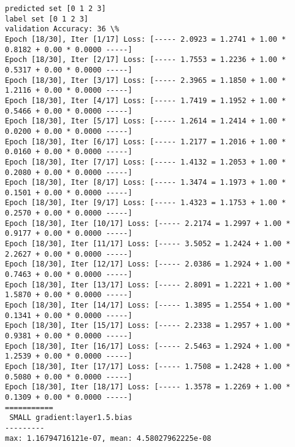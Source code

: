 \documentclass[11pt]{article}
\begin{document}
    \begin{Verbatim}[commandchars=\\\{\}]
predicted set [0 1 2 3]
label set [0 1 2 3]
validation Accuracy: 36 \%
Epoch [18/30], Iter [1/17] Loss: [----- 2.0923 = 1.2741 + 1.00 * 0.8182 + 0.00 * 0.0000 -----]
Epoch [18/30], Iter [2/17] Loss: [----- 1.7553 = 1.2236 + 1.00 * 0.5317 + 0.00 * 0.0000 -----]
Epoch [18/30], Iter [3/17] Loss: [----- 2.3965 = 1.1850 + 1.00 * 1.2116 + 0.00 * 0.0000 -----]
Epoch [18/30], Iter [4/17] Loss: [----- 1.7419 = 1.1952 + 1.00 * 0.5466 + 0.00 * 0.0000 -----]
Epoch [18/30], Iter [5/17] Loss: [----- 1.2614 = 1.2414 + 1.00 * 0.0200 + 0.00 * 0.0000 -----]
Epoch [18/30], Iter [6/17] Loss: [----- 1.2177 = 1.2016 + 1.00 * 0.0160 + 0.00 * 0.0000 -----]
Epoch [18/30], Iter [7/17] Loss: [----- 1.4132 = 1.2053 + 1.00 * 0.2080 + 0.00 * 0.0000 -----]
Epoch [18/30], Iter [8/17] Loss: [----- 1.3474 = 1.1973 + 1.00 * 0.1501 + 0.00 * 0.0000 -----]
Epoch [18/30], Iter [9/17] Loss: [----- 1.4323 = 1.1753 + 1.00 * 0.2570 + 0.00 * 0.0000 -----]
Epoch [18/30], Iter [10/17] Loss: [----- 2.2174 = 1.2997 + 1.00 * 0.9177 + 0.00 * 0.0000 -----]
Epoch [18/30], Iter [11/17] Loss: [----- 3.5052 = 1.2424 + 1.00 * 2.2627 + 0.00 * 0.0000 -----]
Epoch [18/30], Iter [12/17] Loss: [----- 2.0386 = 1.2924 + 1.00 * 0.7463 + 0.00 * 0.0000 -----]
Epoch [18/30], Iter [13/17] Loss: [----- 2.8091 = 1.2221 + 1.00 * 1.5870 + 0.00 * 0.0000 -----]
Epoch [18/30], Iter [14/17] Loss: [----- 1.3895 = 1.2554 + 1.00 * 0.1341 + 0.00 * 0.0000 -----]
Epoch [18/30], Iter [15/17] Loss: [----- 2.2338 = 1.2957 + 1.00 * 0.9381 + 0.00 * 0.0000 -----]
Epoch [18/30], Iter [16/17] Loss: [----- 2.5463 = 1.2924 + 1.00 * 1.2539 + 0.00 * 0.0000 -----]
Epoch [18/30], Iter [17/17] Loss: [----- 1.7508 = 1.2428 + 1.00 * 0.5080 + 0.00 * 0.0000 -----]
Epoch [18/30], Iter [18/17] Loss: [----- 1.3578 = 1.2269 + 1.00 * 0.1309 + 0.00 * 0.0000 -----]
===========
 SMALL gradient:layer1.5.bias
---------
max: 1.16794716121e-07, mean: 4.58027962225e-08

    \end{Verbatim}

    \begin{center}
    \end{center}
    { \hspace*{\fill} \\}
    
    \begin{center}
    \end{center}
    { \hspace*{\fill} \\}
    
\end{document}

